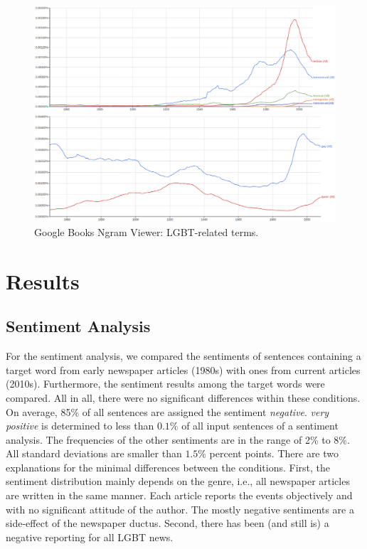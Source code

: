 \documentclass[10pt,a4paper,twocolumn]{scrartcl}
\begin{document}
\begin{figure}
\centering
\includegraphics[width=\textwidth]{figures/google_queryterms}

\vspace*{1cm}

\includegraphics[width=\textwidth]{figures/google_others}
\caption{Google Books Ngram Viewer: LGBT-related terms.} \label{fig:google}
\end{figure}



\section{Results}\label{sec:results}



\subsection{Sentiment Analysis}

For the sentiment analysis, we compared the sentiments of sentences containing a target word from early newspaper articles (1980s) with ones from current articles (2010s). Furthermore, the sentiment results among the target words were compared. All in all, there were no significant differences within these conditions. On average, 85\% of all sentences are assigned the sentiment \textit{negative}. \textit{very positive} is determined to less than $0.1\%$ of all input sentences of a sentiment analysis. The frequencies of the other sentiments are in the range of 2\% to 8\%. All standard deviations are smaller than $1.5\%$ percent points. There are two explanations for the minimal differences between the conditions. First, the sentiment distribution mainly depends on the genre, i.e., all newspaper articles are written in the same manner. Each article reports the events objectively and with no significant attitude of the author. The mostly negative sentiments are a side-effect of the newspaper ductus. Second, there has been (and still is) a negative reporting for all LGBT news.
\end{document}
